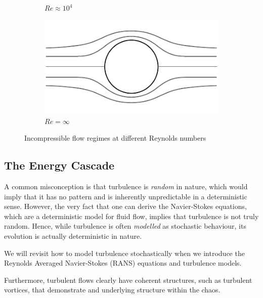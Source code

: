 \begin{figure}[htbp]
\begin{subfigure}[b]{0.40\textwidth}
		\caption{$Re\approx10^4$}
	\end{subfigure}
	\begin{subfigure}[b]{0.40\textwidth}
		\includegraphics[width=\linewidth]{Pictures/ch7_cylinder_1}
		\caption{$Re=\infty$}
	\end{subfigure}
	\caption{Incompressible flow regimes at different Reynolds numbers}
	\label{fig:flow_regimes}
\end{figure}

\subsection{The Energy Cascade}
A common misconception is that turbulence is {\it random} in nature, which would imply that it has no pattern and is inherently unpredictable in a deterministic sense. However, the very fact that one can derive the Navier-Stokes equations, which are a deterministic model for fluid flow, implies that turbulence is not truly random. Hence, while turbulence is often {\it modelled} as stochastic behaviour, its evolution is actually deterministic in nature.
\begin{remark}
We will revisit how to model turbulence stochastically when we introduce the Reynolds Averaged Navier-Stokes (RANS) equations and turbulence models.
\end{remark}
Furthermore, turbulent flows clearly have coherent structures, such as turbulent vortices, that demonstrate and underlying structure within the chaos.

